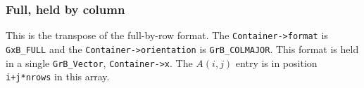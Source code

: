 \subsubsection{Full, held by column}
\label{format_full_by_col}

This is the transpose of the full-by-row format.
The \verb'Container->format' is \verb'GxB_FULL' and the
\verb'Container->orientation' is \verb'GrB_COLMAJOR'.  This format is held in a
single \verb'GrB_Vector', \verb'Container->x'.  The $A(i,j)$ entry is in
position \verb'i+j*nrows' in this array.


